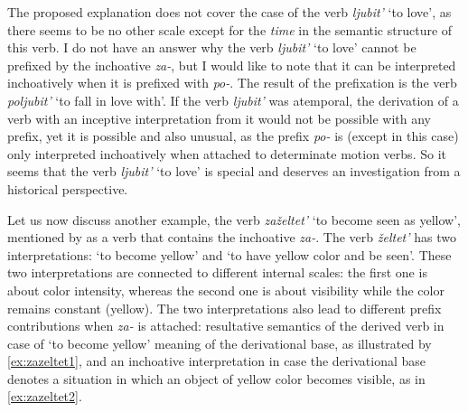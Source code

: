 The proposed explanation does not cover the case of the verb \textit{ljubit'} `to love', as there seems to be no other scale except for the \textit{time} in the semantic structure of this verb. I do not have an answer why the verb \textit{ljubit'} `to love' cannot be prefixed by the inchoative \textit{za-}, but I would like to note that it can be interpreted inchoatively when it is prefixed with \textit{po-}. The result of the prefixation is the verb \textit{poljubit'} `to fall in love with'. If the verb \textit{ljubit'} was atemporal, the derivation of a verb with an inceptive interpretation from it would not be possible with any prefix, yet it is possible and also unusual, as the prefix \textit{po-} is (except in this case) only interpreted inchoatively when attached to determinate motion verbs. So it seems that the verb \textit{ljubit'} `to love' is special and deserves an investigation from a historical perspective. 

Let us now discuss another example, the verb \textit{za\v{z}eltet'} `to become seen as yellow', mentioned by \citet{Braginsky:08} as a verb that contains the inchoative {\textit{za-}.} The verb \textit{\v{z}eltet'} has two interpretations: `to become yellow' and `to have yellow color and be seen'. These two interpretations are connected to different internal scales: the first one is about color intensity, whereas the second one is about visibility while the color remains constant (yellow). The two interpretations also lead to different prefix contributions when \textit{za-} is attached: resultative semantics of the derived verb in case of `to become yellow' meaning of the derivational base, as illustrated by \ref{ex:zazeltet1}, and an inchoative interpretation in case the derivational base denotes a  situation in which an object of yellow color becomes visible, as in \ref{ex:zazeltet2}.


